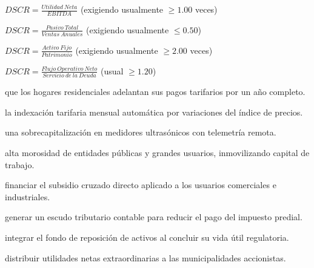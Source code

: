 \begin{opts}
    \item $DSCR = \frac{Utilidad\ Neta}{EBITDA}$ (exigiendo usualmente $\ge 1.00$ veces)
    \item $DSCR = \frac{Pasivo\ Total}{Ventas\ Anuales}$ (exigiendo usualmente $\le 0.50$)
    \item $DSCR = \frac{Activo\ Fijo}{Patrimonio}$ (exigiendo usualmente $\ge 2.00$ veces)
    \item $DSCR = \frac{Flujo\ Operativo\ Neto}{Servicio\ de\ la\ Deuda}$ (usual $\ge 1.20$)
\end{opts}

\begin{opts}
    \item que los hogares residenciales adelantan sus pagos tarifarios por un año completo.
    \item la indexación tarifaria mensual automática por variaciones del índice de precios.
    \item una sobrecapitalización en medidores ultrasónicos con telemetría remota.
    \item alta morosidad de entidades públicas y grandes usuarios, inmovilizando capital de trabajo.
\end{opts}

\begin{opts}
    \item financiar el subsidio cruzado directo aplicado a los usuarios comerciales e industriales.
    \item generar un escudo tributario contable para reducir el pago del impuesto predial.
    \item integrar el fondo de reposición de activos al concluir su vida útil regulatoria.
    \item distribuir utilidades netas extraordinarias a las municipalidades accionistas.
\end{opts}


